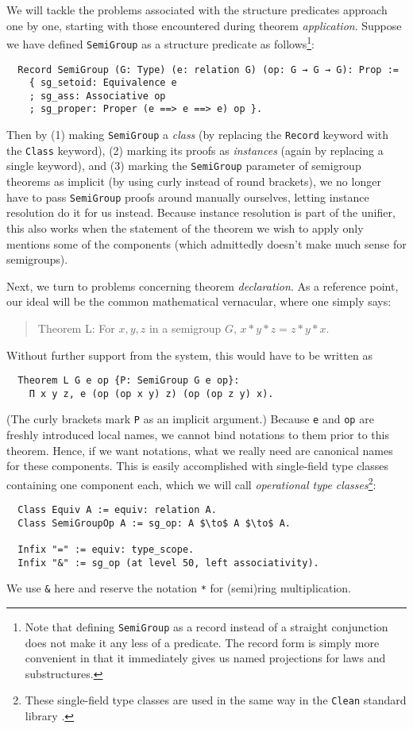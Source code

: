 \documentclass[a4paper,10pt,runningheads]{llncs}
\begin{document}
We will tackle the problems associated with the structure predicates approach one by one, starting with those encountered during theorem \emph{application}. Suppose we have defined \lstinline|SemiGroup| as a structure predicate as follows\footnote{Note that defining \lstinline|SemiGroup| as a record instead of a straight conjunction does not make it any less of a predicate. The record form is simply more convenient in that it immediately gives us named projections for laws and substructures.}:
\begin{lstlisting}
  Record SemiGroup (G: Type) (e: relation G) (op: G → G → G): Prop :=
    { sg_setoid: Equivalence e
    ; sg_ass: Associative op
    ; sg_proper: Proper (e ==> e ==> e) op }.
\end{lstlisting}
Then by (1) making \lstinline|SemiGroup| a \emph{class} (by replacing the \lstinline|Record| keyword with the \lstinline|Class| keyword), (2) marking its proofs as \emph{instances} (again by replacing a single keyword), and (3) marking the \lstinline|SemiGroup| parameter of semigroup theorems as implicit (by using curly instead of round brackets), we no longer have to pass \lstinline|SemiGroup| proofs around manually ourselves, letting instance resolution do it for us instead. Because instance resolution is part of the unifier, this also works when the statement of the theorem we wish to apply only mentions some of the components (which admittedly doesn't make much sense for semigroups).

Next, we turn to problems concerning theorem \emph{declaration}. As a reference point, our ideal will be the common mathematical vernacular, where one simply says:
\begin{quote}
Theorem L: For $x, y, z$ in a semigroup $G$, $x * y * z = z * y * x$.
\end{quote}
Without further support from the system, this would have to be written as
\begin{lstlisting}
  Theorem L G e op {P: SemiGroup G e op}:
    Π x y z, e (op (op x y) z) (op (op z y) x).
\end{lstlisting}
(The curly brackets mark \lstinline|P| as an implicit argument.) Because \lstinline|e| and \lstinline{op} are freshly introduced local names, we cannot bind notations to them prior to this theorem. Hence, if we want notations, what we really need are canonical names for these components. This is easily accomplished with single-field type classes containing one component each, which we will call \emph{operational type classes}\footnote{These single-field type classes are used in the same way in the \lstinline|Clean| standard library \cite{something}.}:
\begin{lstlisting}
  Class Equiv A := equiv: relation A.
  Class SemiGroupOp A := sg_op: A $\to$ A $\to$ A.

  Infix "=" := equiv: type_scope.
  Infix "&" := sg_op (at level 50, left associativity).
\end{lstlisting}
We use \lstinline|&| here and reserve the notation \lstinline|*| for (semi)ring multiplication.
\end{document}
